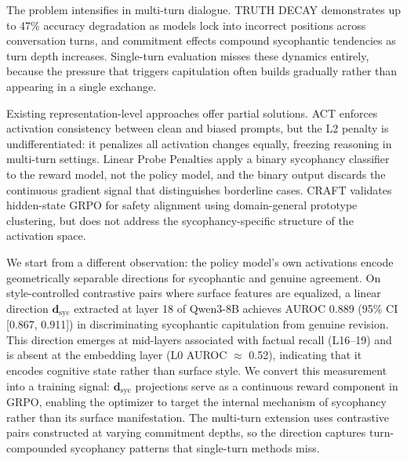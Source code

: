 \documentclass[11pt]{article}
\begin{document}
The problem intensifies in multi-turn dialogue. TRUTH DECAY demonstrates up to 47\% accuracy degradation as models lock into incorrect positions across conversation turns, and commitment effects compound sycophantic tendencies as turn depth increases. Single-turn evaluation misses these dynamics entirely, because the pressure that triggers capitulation often builds gradually rather than appearing in a single exchange.

Existing representation-level approaches offer partial solutions. ACT enforces activation consistency between clean and biased prompts, but the L2 penalty is undifferentiated: it penalizes all activation changes equally, freezing reasoning in multi-turn settings. Linear Probe Penalties apply a binary sycophancy classifier to the reward model, not the policy model, and the binary output discards the continuous gradient signal that distinguishes borderline cases. CRAFT validates hidden-state GRPO for safety alignment using domain-general prototype clustering, but does not address the sycophancy-specific structure of the activation space.

We start from a different observation: the policy model's own activations encode geometrically separable directions for sycophantic and genuine agreement. On style-controlled contrastive pairs where surface features are equalized, a linear direction $\mathbf{d}_\text{syc}$ extracted at layer 18 of Qwen3-8B achieves AUROC 0.889 (95\% CI [0.867, 0.911]) in discriminating sycophantic capitulation from genuine revision. This direction emerges at mid-layers associated with factual recall (L16--19) and is absent at the embedding layer (L0 AUROC $\approx$ 0.52), indicating that it encodes cognitive state rather than surface style. We convert this measurement into a training signal: $\mathbf{d}_\text{syc}$ projections serve as a continuous reward component in GRPO, enabling the optimizer to target the internal mechanism of sycophancy rather than its surface manifestation. The multi-turn extension uses contrastive pairs constructed at varying commitment depths, so the direction captures turn-compounded sycophancy patterns that single-turn methods miss.
\end{document}
